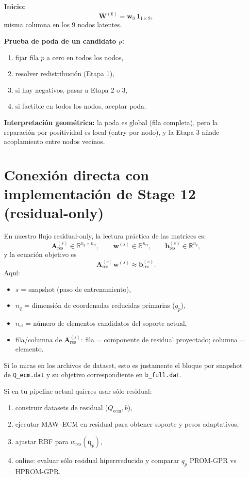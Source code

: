 \documentclass[11pt,a4paper]{article}
\newcommand{\W}{\bm W}
\newcommand{\A}{\bm A}
\begin{document}
\textbf{Inicio:}
\[
\W^{(0)}=\bm w_0\,\bm 1_{1\times 9},
\]
misma columna en los 9 nodos latentes.

\textbf{Prueba de poda de un candidato $p$:}
\begin{enumerate}[leftmargin=1.2cm]
    \item fijar fila $p$ a cero en todos los nodos,
    \item resolver redistribuci\'on (Etapa 1),
    \item si hay negativos, pasar a Etapa 2 o 3,
    \item si factible en todos los nodos, aceptar poda.
\end{enumerate}

\textbf{Interpretaci\'on geom\'etrica:}
la poda es global (fila completa), pero la reparaci\'on por positividad es
local (entry por nodo), y la Etapa 3 a\~nade acoplamiento entre nodos vecinos.

\section{Conexi\'on directa con implementaci\'on de Stage 12 (residual-only)}
En nuestro flujo residual-only, la lectura pr\'actica de las matrices es:
\[
\A^{(s)}_{\text{res}} \in \mathbb R^{n_q\times n_{\text{el}}},
\qquad
\bm w^{(s)}\in\mathbb R^{n_{\text{el}}},
\qquad
\bm b^{(s)}_{\text{res}}\in\mathbb R^{n_q},
\]
y la ecuaci\'on objetivo es
\[
\A^{(s)}_{\text{res}}\bm w^{(s)} \approx \bm b^{(s)}_{\text{res}}.
\]
Aqu\'i:
\begin{itemize}[leftmargin=0.8cm]
    \item $s$ = snapshot (paso de entrenamiento),
    \item $n_q$ = dimensi\'on de coordenadas reducidas primarias ($q_p$),
    \item $n_{\text{el}}$ = n\'umero de elementos candidatos del soporte actual,
    \item fila/columna de $\A_{\text{res}}^{(s)}$: fila = componente de residual proyectado; columna = elemento.
\end{itemize}
Si lo miras en los archivos de dataset, esto es justamente el bloque por snapshot de
\texttt{Q\_ecm.dat} y su objetivo correspondiente en \texttt{b\_full.dat}.

Si en tu pipeline actual quieres usar s\'olo residual:
\begin{enumerate}[leftmargin=1.2cm]
    \item construir datasets de residual ($Q_{\text{ecm}},b$),
    \item ejecutar MAW--ECM en residual para obtener soporte y pesos adaptativos,
    \item ajustar RBF para $w_{\text{res}}(\bm q_p)$,
    \item online: evaluar s\'olo residual hiperrreducido y comparar $q_p$
    PROM-GPR vs HPROM-GPR.
\end{enumerate}
\end{document}
